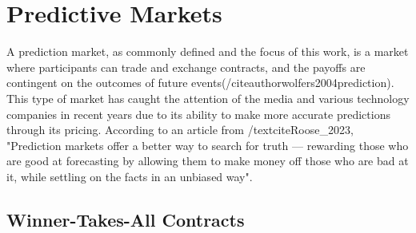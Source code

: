 \section{Predictive Markets}
\label{sec:predictive_markets}
A prediction market, as commonly defined and the focus of this work, is a market where participants can trade and exchange contracts, and the payoffs are contingent on the outcomes of future events(/citeauthor{wolfers2004prediction}). This type of market has caught the attention of the media and various technology companies in recent years due to its ability to make more accurate predictions through its pricing. According to an article from /textcite{Roose_2023}, "Prediction markets offer a better way to search for truth — rewarding those who are good at forecasting by allowing them to make money off those who are bad at it, while settling on the facts in an unbiased way".

\lipsum[2]

\subsection{Winner-Takes-All Contracts}
\label{subsec:winner_takes_all_contracts}

\lipsum[2]
